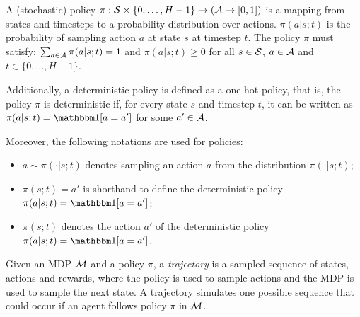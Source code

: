     \begin{defn}
        \label{def:2:policy}
        A \textnormal{(stochastic) policy} $\pi:\mathcal{S}\times\{0,\ldots,H-1\}\rightarrow (\mathcal{A} \rightarrow [0,1])$ is a mapping from states and timesteps to a probability distribution over actions. $\pi(a|s;t)$ is the probability of sampling action $a$ at state $s$ at timestep $t$. The policy $\pi$ must satisfy: $\sum_{a\in\mathcal{A}} \pi(a|s;t) = 1$ and $\pi(a|s;t)\geq 0$ for all $s\in\mathcal{S}$, $a\in\mathcal{A}$ and $t\in\{0,\ldots,H-1\}$.

        Additionally, a \textnormal{deterministic policy} is defined as a one-hot policy, that is, the policy $\pi$ is deterministic if, for every state $s$ and timestep $t$, it can be written as $\pi(a|s;t)=\one[a=a']$ for some $a'\in\mathcal{A}$.

        Moreover, the following notations are used for policies:
        \begin{itemize}
            \item $a\sim\pi(\cdot|s;t)$ denotes sampling an action $a$ from the distribution $\pi(\cdot|s;t)$;
            \item $\pi(s;t)=a'$ is shorthand to define the deterministic policy $\pi(a|s;t)=\one[a=a']$;
            \item $\pi(s;t)$ denotes the action $a'$ of the deterministic policy $\pi(a|s;t)=\one[a=a']$.
        \end{itemize}
    \end{defn}
    
    Given an MDP $\mathcal{M}$ and a policy $\pi$, a \textit{trajectory} is a sampled sequence of states, actions and rewards, where the policy is used to sample actions and the MDP is used to sample the next state. A trajectory simulates one possible sequence that could occur if an agent follows policy $\pi$ in $\mathcal{M}$.
    
